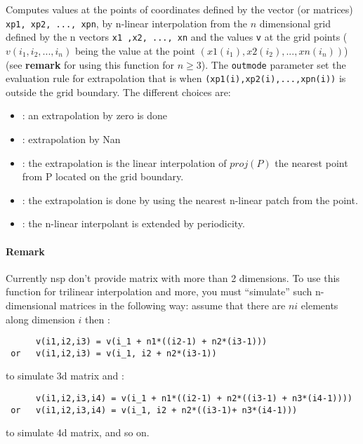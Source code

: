 \begin{mandescription}

  Computes values at the points of coordinates defined
  by the vector (or matrices) \verb!xp1, xp2, ..., xpn!, by n-linear
  interpolation from the $n$ dimensional grid defined by the n vectors 
  \verb!x1 ,x2, ..., xn! and the values \verb!v! at the grid points 
  ($v(i_1,i_2,...,i_n)$ being the value at the point
  $(x1(i_1),x2(i_2), ..., xn(i_n))$) (see {\bf remark} for using
  this function for $n \ge 3$).
  The \verb!outmode! parameter set the evaluation rule for
  extrapolation that is when \verb+(xp1(i),xp2(i),...,xpn(i))+ is 
  outside the grid boundary. The different choices are:
  \begin{itemize}
       \item {}: an extrapolation by zero is done
       \item {}: extrapolation by Nan
       \item {}: the extrapolation is the linear
         interpolation of $proj(P)$ the nearest point from P located on the grid boundary.
       \item {}: the extrapolation is done by using the nearest n-linear patch from the point.
       \item {}: the n-linear interpolant is extended by periodicity. 
  \end{itemize}

\end{mandescription}
 
\paragraph{Remark}
  Currently nsp don't provide matrix with more than 2 dimensions. To
  use this function for trilinear interpolation and more, you must 
  ``simulate'' such n-dimensional matrices in the following way:
  assume that there are $ni$ elements along dimension $i$ then :
  \begin{verbatim}
      v(i1,i2,i3) = v(i_1 + n1*((i2-1) + n2*(i3-1)))
 or   v(i1,i2,i3) = v(i_1, i2 + n2*(i3-1))\end{verbatim}
  to simulate 3d matrix and :
  \begin{verbatim}
      v(i1,i2,i3,i4) = v(i_1 + n1*((i2-1) + n2*((i3-1) + n3*(i4-1))))
 or   v(i1,i2,i3,i4) = v(i_1, i2 + n2*((i3-1)+ n3*(i4-1)))\end{verbatim}
 to simulate 4d matrix, and so on.

